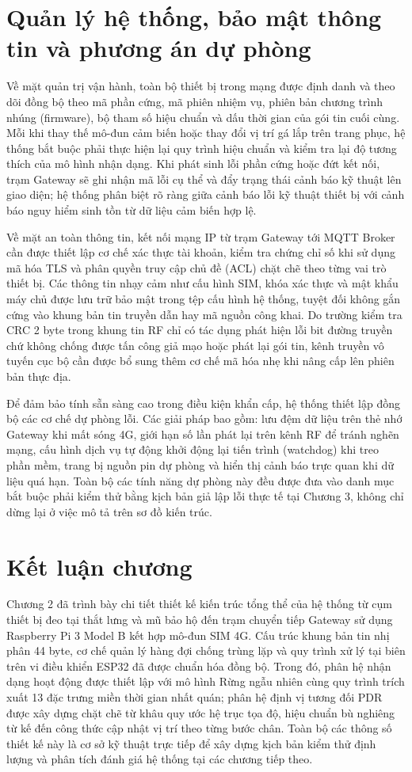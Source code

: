 \section{Quản lý hệ thống, bảo mật thông tin và phương án dự phòng}
Về mặt quản trị vận hành, toàn bộ thiết bị trong mạng được định danh và theo dõi đồng bộ theo mã phần cứng, mã phiên nhiệm vụ, phiên bản chương trình nhúng (firmware), bộ tham số hiệu chuẩn và dấu thời gian của gói tin cuối cùng. Mỗi khi thay thế mô-đun cảm biến hoặc thay đổi vị trí gá lắp trên trang phục, hệ thống bắt buộc phải thực hiện lại quy trình hiệu chuẩn và kiểm tra lại độ tương thích của mô hình nhận dạng. Khi phát sinh lỗi phần cứng hoặc đứt kết nối, trạm Gateway sẽ ghi nhận mã lỗi cụ thể và đẩy trạng thái cảnh báo kỹ thuật lên giao diện; hệ thống phân biệt rõ ràng giữa cảnh báo lỗi kỹ thuật thiết bị với cảnh báo nguy hiểm sinh tồn từ dữ liệu cảm biến hợp lệ.

Về mặt an toàn thông tin, kết nối mạng IP từ trạm Gateway tới MQTT Broker cần được thiết lập cơ chế xác thực tài khoản, kiểm tra chứng chỉ số khi sử dụng mã hóa TLS và phân quyền truy cập chủ đề (ACL) chặt chẽ theo từng vai trò thiết bị. Các thông tin nhạy cảm như cấu hình SIM, khóa xác thực và mật khẩu máy chủ được lưu trữ bảo mật trong tệp cấu hình hệ thống, tuyệt đối không gắn cứng vào khung bản tin truyền dẫn hay mã nguồn công khai. Do trường kiểm tra CRC 2 byte trong khung tin RF chỉ có tác dụng phát hiện lỗi bit đường truyền chứ không chống được tấn công giả mạo hoặc phát lại gói tin, kênh truyền vô tuyến cục bộ cần được bổ sung thêm cơ chế mã hóa nhẹ khi nâng cấp lên phiên bản thực địa.

Để đảm bảo tính sẵn sàng cao trong điều kiện khẩn cấp, hệ thống thiết lập đồng bộ các cơ chế dự phòng lỗi. Các giải pháp bao gồm: lưu đệm dữ liệu trên thẻ nhớ Gateway khi mất sóng 4G, giới hạn số lần phát lại trên kênh RF để tránh nghẽn mạng, cấu hình dịch vụ tự động khởi động lại tiến trình (watchdog) khi treo phần mềm, trang bị nguồn pin dự phòng và hiển thị cảnh báo trực quan khi dữ liệu quá hạn. Toàn bộ các tính năng dự phòng này đều được đưa vào danh mục bắt buộc phải kiểm thử bằng kịch bản giả lập lỗi thực tế tại Chương 3, không chỉ dừng lại ở việc mô tả trên sơ đồ kiến trúc.

\section{Kết luận chương}
Chương 2 đã trình bày chi tiết thiết kế kiến trúc tổng thể của hệ thống từ cụm thiết bị đeo tại thắt lưng và mũ bảo hộ đến trạm chuyển tiếp Gateway sử dụng Raspberry Pi 3 Model B kết hợp mô-đun SIM 4G. Cấu trúc khung bản tin nhị phân 44 byte, cơ chế quản lý hàng đợi chống trùng lặp và quy trình xử lý tại biên trên vi điều khiển ESP32 đã được chuẩn hóa đồng bộ. Trong đó, phân hệ nhận dạng hoạt động được thiết lập với mô hình Rừng ngẫu nhiên cùng quy trình trích xuất 13 đặc trưng miền thời gian nhất quán; phân hệ định vị tương đối PDR được xây dựng chặt chẽ từ khâu quy ước hệ trục tọa độ, hiệu chuẩn bù nghiêng từ kế đến công thức cập nhật vị trí theo từng bước chân. Toàn bộ các thông số thiết kế này là cơ sở kỹ thuật trực tiếp để xây dựng kịch bản kiểm thử định lượng và phân tích đánh giá hệ thống tại các chương tiếp theo.